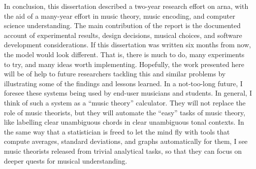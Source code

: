 
In conclusion, this dissertation described a two-year
research effort on \gls{arna}, with the aid of a many-year
effort in music theory, music encoding, and computer science
understanding. The main contribution of the report is the
documented account of experimental results, design
decisions, musical choices, and software development
considerations. If this dissertation was written six months
from now, the model would look different. That is, there is
much to do, many experiments to try, and many ideas worth
implementing. Hopefully, the work presented here will be of
help to future researchers tackling this and similar
problems by illustrating some of the findings and lessons
learned. In a not-too-long future, I foresee these systems
being used by end-user musicians and students. In general, I
think of such a system as a ``music theory'' calculator.
They will not replace the role of music theorists, but they
will automate the ``easy'' tasks of music theory, like
labelling clear unambiguous chords in clear unambiguous
tonal contexts. In the same way that a statistician is freed
to let the mind fly with tools that compute averages,
standard deviations, and graphs automatically for them, I
see music theorists released from trivial analytical tasks,
so that they can focus on deeper quests for musical
understanding.
